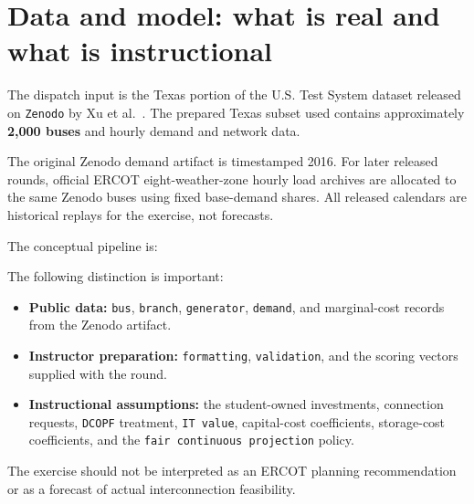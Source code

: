 \documentclass[12pt]{article}
\newcommand{\code}[1]{\texttt{#1}}
\begin{document}
\section{Data and model: what is real and what is instructional}

The dispatch input is the Texas portion of the U.S. Test System dataset released
on \code{Zenodo} by Xu et al.~\cite{xu2021ustestsystem}. The prepared Texas subset used
contains approximately \textbf{2,000 buses} and hourly demand
and network data.

The original Zenodo demand artifact is timestamped 2016. For later released
rounds, official ERCOT eight-weather-zone hourly load archives are allocated to
the same Zenodo buses using fixed base-demand shares. All released calendars
are historical replays for the exercise, not forecasts.

The conceptual pipeline is:
\begin{center}
\end{center}

The following distinction is important:
\begin{itemize}[leftmargin=*]
  \item \textbf{Public data:} \code{bus}, \code{branch}, \code{generator}, \code{demand}, and
  marginal-cost records from the Zenodo artifact.
  \item \textbf{Instructor preparation:} 
  \code{formatting}, \code{validation}, and the scoring vectors supplied with the round.
  \item \textbf{Instructional assumptions:} the student-owned investments,
  connection requests, \code{DCOPF} treatment, \code{IT value}, capital-cost coefficients,
  storage-cost coefficients, and the \code{fair continuous projection} policy.
\end{itemize}

The exercise should not be interpreted as an ERCOT planning recommendation or
as a forecast of actual interconnection feasibility.
\end{document}
